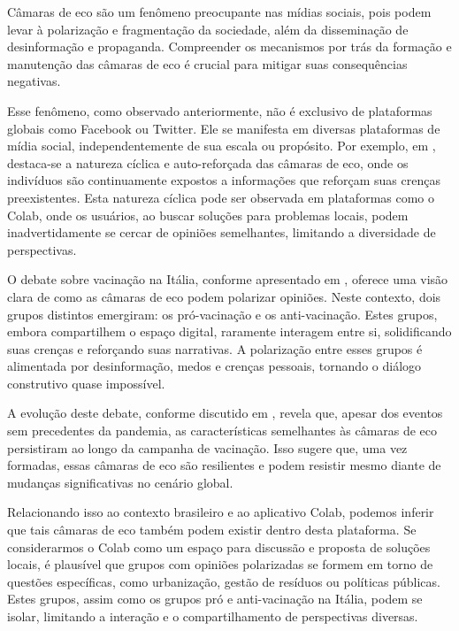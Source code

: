 Câmaras de eco são um fenômeno preocupante nas mídias sociais, pois podem levar à polarização e fragmentação da sociedade, além da disseminação de desinformação e propaganda. Compreender os mecanismos por trás da formação e manutenção das câmaras de eco é crucial para mitigar suas consequências negativas.

Esse fenômeno, como observado anteriormente, não é exclusivo de plataformas globais como Facebook ou Twitter. Ele se manifesta em diversas plataformas de mídia social, independentemente de sua escala ou propósito. Por exemplo, em , destaca-se a natureza cíclica e auto-reforçada das câmaras de eco, onde os indivíduos são continuamente expostos a informações que reforçam suas crenças preexistentes. Esta natureza cíclica pode ser observada em plataformas como o Colab, onde os usuários, ao buscar soluções para problemas locais, podem inadvertidamente se cercar de opiniões semelhantes, limitando a diversidade de perspectivas.

O debate sobre vacinação na Itália, conforme apresentado em , oferece uma visão clara de como as câmaras de eco podem polarizar opiniões. Neste contexto, dois grupos distintos emergiram: os pró-vacinação e os anti-vacinação. Estes grupos, embora compartilhem o espaço digital, raramente interagem entre si, solidificando suas crenças e reforçando suas narrativas. A polarização entre esses grupos é alimentada por desinformação, medos e crenças pessoais, tornando o diálogo construtivo quase impossível.

A evolução deste debate, conforme discutido em , revela que, apesar dos eventos sem precedentes da pandemia, as características semelhantes às câmaras de eco persistiram ao longo da campanha de vacinação. Isso sugere que, uma vez formadas, essas câmaras de eco são resilientes e podem resistir mesmo diante de mudanças significativas no cenário global.

Relacionando isso ao contexto brasileiro e ao aplicativo Colab, podemos inferir que tais câmaras de eco também podem existir dentro desta plataforma. Se considerarmos o Colab como um espaço para discussão e proposta de soluções locais, é plausível que grupos com opiniões polarizadas se formem em torno de questões específicas, como urbanização, gestão de resíduos ou políticas públicas. Estes grupos, assim como os grupos pró e anti-vacinação na Itália, podem se isolar, limitando a interação e o compartilhamento de perspectivas diversas.

